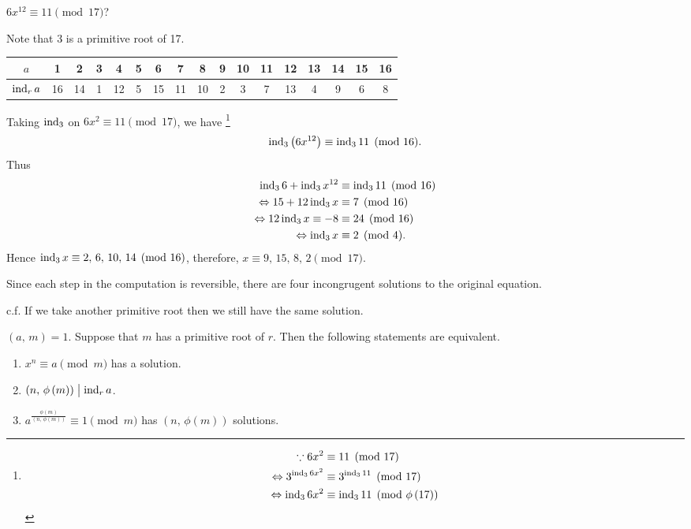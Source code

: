 \begin{example}
    $6x^{12} \equiv 11 \pmod{17}$?

    Note that 3 is a primitive root of 17.
    \begin{center}
        \begin{tabular}{c|cccccccccccccccc}
            \hline
            $a$ & 1 & 2 & 3 & 4 & 5 & 6 & 7 & 8 & 9 & 10 & 11 & 12 & 13 & 14 & 15 & 16 \\
            \hline
            $\operatorname{\mathrm{ind}}_r a$ & 16 & 14 & 1 & 12 & 5 & 15 & 11 & 10 & 2 & 3 & 7 & 13 & 4 & 9 & 6 & 8 \\
            \hline
        \end{tabular}
    \end{center}
    Taking $\operatorname{\mathrm{ind}}_3$ on $6x^2 \equiv 11 \pmod{17}$, we have
    \footnote{
        \begin{align*}
            \because 6x^2 & \equiv 11 \pmod{17} \\
            \Leftrightarrow 3^{\operatorname{\mathrm{ind}}_3 6x^2} & \equiv 3^{\operatorname{\mathrm{ind}}_3 11} \pmod{17} \\
            \Leftrightarrow \operatorname{\mathrm{ind}}_3 6x^2 & \equiv \operatorname{\mathrm{ind}}_3 11 \pmod{\phi\left(17\right)}
        \end{align*}
    }
    \[
        \operatorname{\mathrm{ind}}_3 \left(6x^{12}\right) \equiv \operatorname{\mathrm{ind}}_3 11 \pmod{16}.
    \]
    Thus
    \begin{align*}
        \operatorname{\mathrm{ind}}_3 6 + \operatorname{\mathrm{ind}}_3 x^{12} & \equiv \operatorname{\mathrm{ind}}_3 11 \pmod{16} \\
        \Leftrightarrow 15 + 12 \operatorname{\mathrm{ind}}_3 x & \equiv 7 \pmod{16} \\
        \Leftrightarrow 12 \operatorname{\mathrm{ind}}_3 x \equiv -8 & \equiv 24 \pmod{16} \\
        \Leftrightarrow \operatorname{\mathrm{ind}}_3 x & \equiv 2 \pmod{4}.
    \end{align*}
    Hence $\operatorname{\mathrm{ind}}_3 x \equiv 2,\,6,\,10,\,14 \pmod{16}$, therefore,
    $x \equiv 9,\,15,\,8,\,2 \pmod{17}$.

    Since each step in the computation is reversible, there are four
    incongrugent solutions to the original equation.

    c.f. If we take another primitive root then we still have the same solution.
\end{example}

\begin{theorem}
    $\left(a,\,m\right)=1$. Suppose that $m$ has a primitive root of $r$.
    Then the following statements are equivalent.
    \begin{enumerate}
        \item $x^n \equiv a \pmod{m}$ has a solution.
        \item $\left(n,\,\phi\left(m\right)\right) \bigm| \operatorname{\mathrm{ind}}_r a$.
        \item $a^{\frac{\phi\left(m\right)}{\left(n,\,\phi\left(m\right)\right)}} \equiv 1 \pmod{m}$
        has $\left(n,\,\phi\left(m\right)\right)$ solutions.
    \end{enumerate}
\end{theorem}

